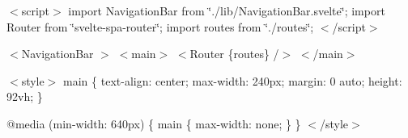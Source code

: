 $<$script$>$ import Navigation\+Bar from \char`\"{}./lib/\+Navigation\+Bar.\+svelte\char`\"{}; import Router from \char`\"{}svelte-\/spa-\/router\char`\"{}; import routes from \char`\"{}./routes\char`\"{}; $<$/script$>$

$<$\+Navigation\+Bar $>$ $<$main$>$ \texorpdfstring{$<$}{<}Router \{routes\} /\texorpdfstring{$>$}{>} $<$/main$>$

$<$style$>$ main \{ text-\/align\+: center; max-\/width\+: 240px; margin\+: 0 auto; height\+: 92vh; \}

@media (min-\/width\+: 640px) \{ main \{ max-\/width\+: none; \} \} $<$/style$>$ 